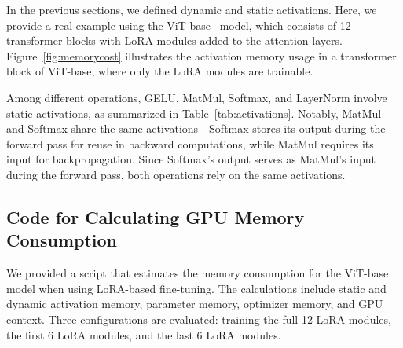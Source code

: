 \documentclass[sigconf]{acmart}
\begin{document}
    In the previous sections, we defined dynamic and static activations. Here, we provide a real example using the ViT-base~\cite{dosovitskiy2020image} model, which consists of 12 transformer blocks with LoRA modules added to the attention layers. Figure~\ref{fig:memorycost} illustrates the activation memory usage in a transformer block of ViT-base, where only the LoRA modules are trainable.

    Among different operations, GELU, MatMul, Softmax, and LayerNorm involve static activations, as summarized in Table~\ref{tab:activations}. Notably, MatMul and Softmax share the same activations—Softmax stores its output during the forward pass for reuse in backward computations, while MatMul requires its input for backpropagation. Since Softmax’s output serves as MatMul’s input during the forward pass, both operations rely on the same activations.

    \subsection{Code for Calculating GPU Memory Consumption}\label{subsec:appendix-memory-footprint-example}



\lstset{style=mystyle}

We provided a script that estimates the memory consumption for the ViT-base model when using LoRA-based fine-tuning. The calculations include static and dynamic activation memory, parameter memory, optimizer memory, and GPU context. Three configurations are evaluated: training the full 12 LoRA modules, the first 6 LoRA modules, and the last 6 LoRA modules.
\end{document}
